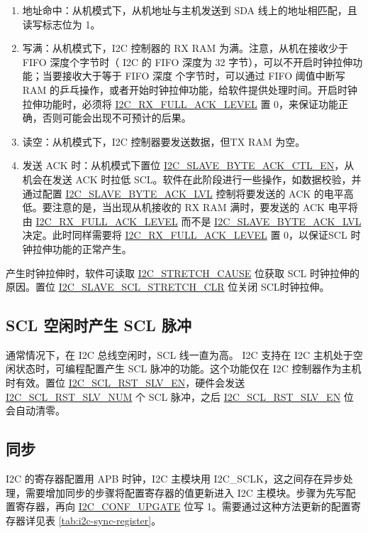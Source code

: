 \documentclass[main\_\_CN.tex]{subfiles}
\begin{document}
\begin{enumerate}
\item 地址命中：从机模式下，从机地址与主机发送到 SDA 线上的地址相匹配，且读写标志位为 1。
\item 写满：从机模式下，I2C 控制器的 RX RAM 为满。注意，从机在接收少于 FIFO 深度个字节时（\chipseries{} I2C 的 FIFO 深度为 32 字节），可以不开启时钟拉伸功能；当要接收大于等于 FIFO 深度 个字节时，可以通过 FIFO 阈值中断写 RAM 的乒乓操作，或者开始时钟拉伸功能，给软件提供处理时间。开启时钟拉伸功能时，必须将 \hyperref[fielddesc:I2CRXFULLACKLEVEL]{I2C\_RX\_FULL\_ACK\_LEVEL} 置 0，来保证功能正确，否则可能会出现不可预计的后果。
\item 读空：从机模式下，I2C 控制器要发送数据，但TX RAM 为空。
\item 发送 ACK 时：从机模式下置位 \hyperref[fielddesc:I2CSLAVEBYTEACKCTLEN]{I2C\_SLAVE\_BYTE\_ACK\_CTL\_EN}，从机会在发送 ACK 时拉低 SCL。软件在此阶段进行一些操作，如数据校验，并通过配置 \hyperref[fielddesc:I2CSLAVEBYTEACKLVL]{I2C\_SLAVE\_BYTE\_ACK\_LVL} 控制将要发送的 ACK 的电平高低。要注意的是，当出现从机接收的 RX RAM 满时，要发送的 ACK 电平将由 \hyperref[fielddesc:I2CRXFULLACKLEVEL]{I2C\_RX\_FULL\_ACK\_LEVEL} 而不是 \hyperref[fielddesc:I2CSLAVEBYTEACKLVL]{I2C\_SLAVE\_BYTE\_ACK\_LVL} 决定。此时同样需要将 \hyperref[fielddesc:I2CRXFULLACKLEVEL]{I2C\_RX\_FULL\_ACK\_LEVEL} 置 0，以保证SCL 时钟拉伸功能的正常产生。
\end{enumerate}

产生时钟拉伸时，软件可读取 \hyperref[fielddesc:I2CSTRETCHCAUSE]{I2C\_STRETCH\_CAUSE} 位获取 SCL 时钟拉伸的原因。置位 \hyperref[fielddesc:I2CSLAVESCLSTRETCHCLR]{I2C\_SLAVE\_SCL\_STRETCH\_CLR} 位关闭 SCL时钟拉伸。

\subsection{SCL 空闲时产生 SCL 脉冲}
通常情况下，在 I2C 总线空闲时，SCL 线一直为高。\chipname{} I2C 支持在 I2C 主机处于空闲状态时，可编程配置产生 SCL 脉冲的功能。这个功能仅在 I2C 控制器作为主机时有效。置位 \hyperref[fielddesc:I2CSCLRSTSLVEN]{I2C\_SCL\_RST\_SLV\_EN}，硬件会发送 \hyperref[fielddesc:I2CSCLRSTSLVNUM]{I2C\_SCL\_RST\_SLV\_NUM} 个 SCL 脉冲，之后 \hyperref[fielddesc:I2CSCLRSTSLVEN]{I2C\_SCL\_RST\_SLV\_EN} 位
会自动清零。

\subsection{同步}
I2C 的寄存器配置用 APB 时钟，I2C 主模块用 I2C\_SCLK，这之间存在异步处理，需要增加同步的步骤将配置寄存器的值更新进入 I2C 主模块。步骤为先写配置寄存器，再向 \hyperref[fielddesc:I2CCONFUPGATE]{I2C\_CONF\_UPGATE} 位写 1。需要通过这种方法更新的配置寄存器详见表 \ref{tab:i2c-sync-register}。
\end{document}
